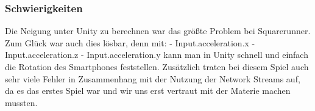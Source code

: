 \subsubsection{Schwierigkeiten}
Die Neigung unter Unity zu berechnen war das größte Problem bei Squarerunner. Zum Glück war auch dies lösbar, denn mit:
\newline 
- Input.acceleration.x
\newline
- Input.acceleration.z
\newline
- Input.acceleration.y
\newline
kann man in Unity schnell und einfach die Rotation des Smartphones feststellen.
Zusätzlich traten bei diesem Spiel auch sehr viele Fehler in Zusammenhang mit der Nutzung der Network Streams auf, da es das erstes Spiel war und wir uns erst vertraut mit der Materie machen mussten.
